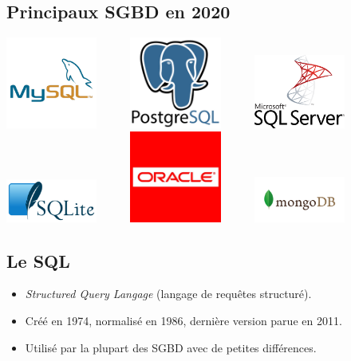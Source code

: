 \documentclass[10pt,cours,a4paper,firamath]{nsi}
\begin{document}
\subsection{Principaux SGBD en 2020}
\includegraphics[width=3cm]{img/mysql}\ \ \ \ \ \ \includegraphics[width=3cm]{img/postgresql}\ \ \ \ \ \ \includegraphics[width=3cm]{img/microsoftsqlserver}\\[2em]
\includegraphics[width=3cm]{img/sqlite}\ \ \ \ \ \ \includegraphics[width=3cm]{img/oracle}\ \ \ \ \ \ \includegraphics[width=3cm]{img/mongodb}


\subsection{Le SQL}
\begin{itemize}
    \item	\textit{Structured Query Langage} (langage de requêtes structuré).
    \item	Créé en 1974, normalisé en 1986, dernière version parue en 2011.
    \item 	Utilisé par la plupart des SGBD avec de petites différences.
\end{itemize}
\end{document}
